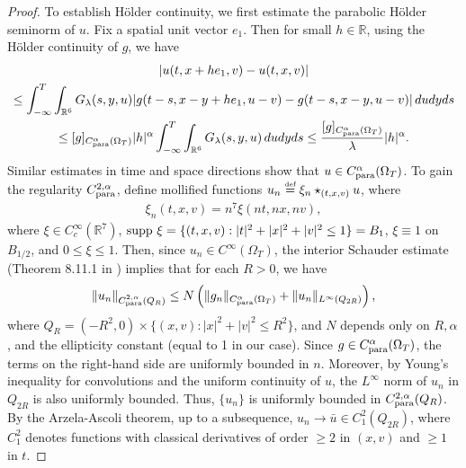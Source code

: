 \documentclass[reqno,11pt,final]{amsart}
\theoremstyle{plain}
\numberwithin{equation}{section}
\numberwithin{theorem}{section}
\newcommand{\eqdef }{\overset{\mbox{\tiny{def}}}{=}}
\begin{document}
\begin{proof}
To establish H\"older continuity, we first estimate the parabolic H\"older seminorm of $u$. Fix a spatial unit vector $e_1$. Then for small $h\in\mathbb{R}$, using the H\"older continuity of $g$, we have
\begin{multline*}
|u(t,x+he_1,v) - u(t,x,v)| \\
\le \int_{-\infty}^T\int_{\mathbb{R}^6} G_\lambda(s,y,u)|g(t-s,x-y+he_1,u-v) - g(t-s,x-y,u-v)|\,dudyds\\
\le [g]_{C_\textup{para}^\alpha(\Omega_T)}|h|^\alpha \int_{-\infty}^T \int_{\mathbb{R}^6} G_\lambda(s,y,u)\,dudyds
\le \frac{[g]_{C_\textup{para}^\alpha(\Omega_T)}}{\lambda}|h|^\alpha.
\end{multline*}Similar estimates in time and space directions show that $u\in C^\alpha_\textup{para}(\Omega_T)$. To gain the regularity $C^{2,\alpha}_{\textup{para}}$, define mollified functions $u_n\eqdef \xi_n\star_{(t,x,v)}u$, where
\begin{align*}
\xi_n(t,x,v) = n^7\xi(nt,nx,nv),
\end{align*}where $\xi\in C^\infty_c(\mathbb{R}^7)$, $\textup{supp }\xi=\{(t,x,v) : |t|^2 + |x|^2 + |v|^2 \le 1\}= B_1$, $\xi\equiv1$ on $B_{1/2}$, and $0\le\xi\le1$. Then, since $u_n\in C^\infty(\Omega_T)$, the interior Schauder estimate (Theorem 8.11.1 in \cite{Ell_Krylov_1996}) implies that for each $R>0$, we have
\begin{align*}
\| u_n\|_{C^{2,\alpha}_\textup{para}(Q_R)} \le N \left(\| g_n\|_{C^\alpha_\textup{para}(\Omega_T)} + \|u_n\|_{L^\infty(Q_{2R})} \right),
\end{align*}where $Q_R = (-R^2,0)\times \{(x,v): |x|^2 + |v|^2 \le R^2\}$, and $N$ depends only on $R, \alpha$, and the ellipticity constant (equal to 1 in our case). Since $g\in C^\alpha_\textup{para}(\Omega_T)$, the terms on the right-hand side are uniformly bounded in $n$. Moreover, by Young's inequality for convolutions and the uniform continuity of $u$, the $L^\infty$ norm of $u_n$ in $Q_{2R}$ is also uniformly bounded. Thus, $\{u_n\}$ is uniformly bounded in $C^{2,\alpha}_\textup{para}(Q_R)$. By the Arzela-Ascoli theorem, up to a subsequence, $u_n \to \bar{u}\in C^2_1(Q_{2R})$, where $C^2_1$ denotes functions with classical derivatives of order $\ge2$ in $(x,v)$ and $\ge1$ in $t$. 


\end{proof}
\end{document}
